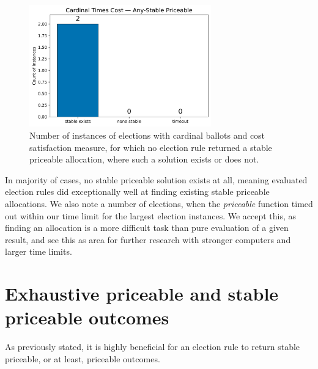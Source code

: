 \begin{figure}[H]         
  \centering              
  \includegraphics[width=0.7\textwidth]{figures/plots/cardinal-times-cost/cardinal_times_cost_any_stable_non-exhaustive.png}
  \caption{Number of instances of elections with cardinal ballots and cost satisfaction measure, for which no election rule returned a stable priceable allocation, where such a solution exists or does not.}
  \label{fig:myplot}
\end{figure}
In majority of cases, no stable priceable solution exists at all, meaning evaluated election rules did exceptionally well at finding existing stable priceable allocations. We also note a number of elections, when the \emph{priceable} function timed out within our time limit for the largest election instances. We accept this, as finding an allocation is a more difficult task than pure evaluation of a given result, and see this as area for further research with stronger computers and larger time limits.
\section{Exhaustive priceable and stable priceable outcomes}
As previously stated, it is highly beneficial for an election rule to return stable priceable, or at least, priceable outcomes. 

